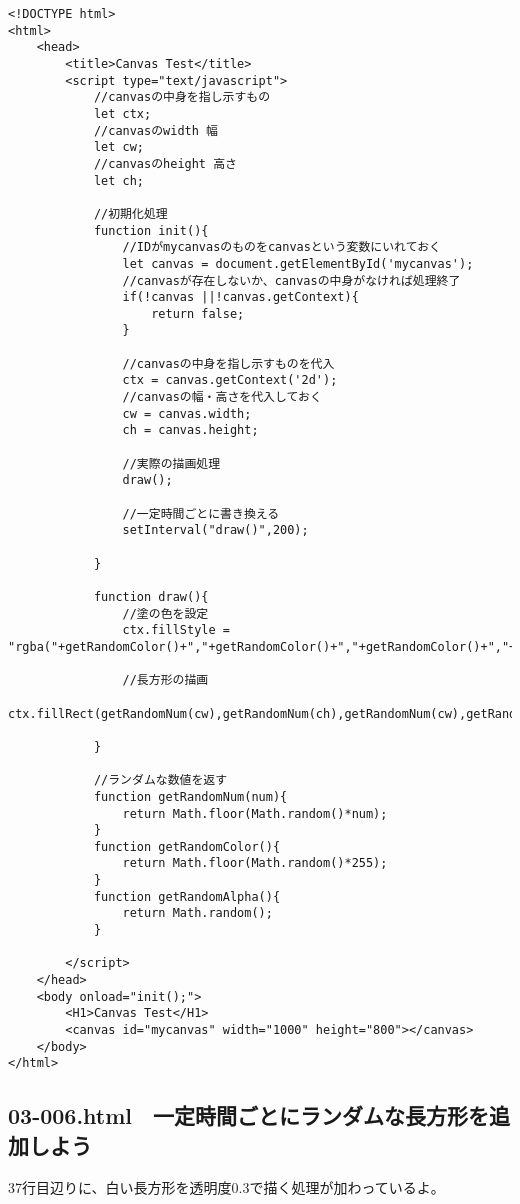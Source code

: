 \documentclass[mingoth,11pt,a4j,uplatex]{jsarticle}
\begin{document}
\begin{lstlisting}[caption=一定時間ごとにランダムな長方形を描こう]
<!DOCTYPE html>
<html>
	<head>
		<title>Canvas Test</title>
		<script type="text/javascript">
			//canvasの中身を指し示すもの
			let ctx;
			//canvasのwidth 幅
			let cw;
			//canvasのheight 高さ
			let ch;
			
			//初期化処理
			function init(){
				//IDがmycanvasのものをcanvasという変数にいれておく
				let canvas = document.getElementById('mycanvas');
				//canvasが存在しないか、canvasの中身がなければ処理終了
				if(!canvas ||!canvas.getContext){
					return false;
				}
				
				//canvasの中身を指し示すものを代入
				ctx = canvas.getContext('2d');
				//canvasの幅・高さを代入しておく
				cw = canvas.width;
				ch = canvas.height;
				
				//実際の描画処理
				draw();
				
				//一定時間ごとに書き換える
				setInterval("draw()",200);

			}
			
			function draw(){
				//塗の色を設定
				ctx.fillStyle = "rgba("+getRandomColor()+","+getRandomColor()+","+getRandomColor()+","+getRandomAlpha()+")";
				
				//長方形の描画
				ctx.fillRect(getRandomNum(cw),getRandomNum(ch),getRandomNum(cw),getRandomNum(ch));

			}
			
			//ランダムな数値を返す
			function getRandomNum(num){
				return Math.floor(Math.random()*num);
			}
			function getRandomColor(){
				return Math.floor(Math.random()*255);
			}
			function getRandomAlpha(){
				return Math.random();
			}

		</script>
	</head>
	<body onload="init();">
		<H1>Canvas Test</H1>
		<canvas id="mycanvas" width="1000" height="800"></canvas>
	</body>
</html>
\end{lstlisting}

\subsection{03-006.html　一定時間ごとにランダムな長方形を追加しよう}
37行目辺りに、白い長方形を透明度0.3で描く処理が加わっているよ。
\end{document}
